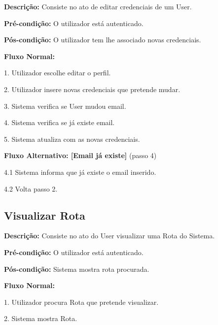 \textbf{Descrição:} Consiste no ato de editar credenciais de um User.

\textbf{Pré-condição:} O utilizador está autenticado.

\textbf{Pós-condição:} O utilizador tem lhe associado novas credenciais.

\textbf{Fluxo Normal:}

1. Utilizador escolhe editar o perfil.

2. Utilizador insere novas credenciais que pretende mudar.

3. Sistema verifica se User mudou email.

4. Sistema verifica se já existe email.

5. Sistema atualiza com as novas credenciais.


\textbf{Fluxo Alternativo: [Email já existe]} (passo 4)

4.1 Sistema informa que já existe o email inserido.

4.2 Volta passo 2.


\subsection{Visualizar Rota}

\textbf{Descrição:} Consiste no ato do User visualizar uma Rota do Sistema.

\textbf{Pré-condição:} O utilizador está autenticado.

\textbf{Pós-condição:} Sistema mostra rota procurada. 

\textbf{Fluxo Normal:}

1. Utilizador procura Rota que pretende visualizar.

2. Sistema mostra Rota.